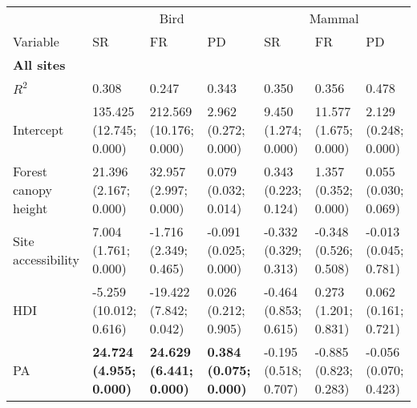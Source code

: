 \documentclass[border=1mm]{standalone}
\begin{document}
\begin{table}
\centering
\begin{tabular}[t]{l|l|l|l|l|l|l}
\hline
\multicolumn{1}{c|}{ } & \multicolumn{3}{c|}{Bird} & \multicolumn{3}{c}{Mammal} \\
\cline{2-4} \cline{5-7}
Variable & SR & FR & PD & SR & FR & PD\\
\hline
\multicolumn{7}{l}{\textbf{All sites}}\\
\hline
\hspace{1em}$R^{2}$ & 0.308 & 0.247 & 0.343 & 0.350 & 0.356 & 0.478\\
\hline
\hspace{1em}Intercept & 135.425 (12.745; 0.000) & 212.569 (10.176; 0.000) & 2.962 (0.272; 0.000) & 9.450 (1.274; 0.000) & 11.577 (1.675; 0.000) & 2.129 (0.248; 0.000)\\
\hline
\hspace{1em}Forest canopy height & 21.396 (2.167; 0.000) & 32.957 (2.997; 0.000) & 0.079 (0.032; 0.014) & 0.343 (0.223; 0.124) & 1.357 (0.352; 0.000) & 0.055 (0.030; 0.069)\\
\hline
\hspace{1em}Site accessibility & 7.004 (1.761; 0.000) & -1.716 (2.349; 0.465) & -0.091 (0.025; 0.000) & -0.332 (0.329; 0.313) & -0.348 (0.526; 0.508) & -0.013 (0.045; 0.781)\\
\hline
\hspace{1em}HDI & -5.259 (10.012; 0.616) & -19.422 (7.842; 0.042) & 0.026 (0.212; 0.905) & -0.464 (0.853; 0.615) & 0.273 (1.201; 0.831) & 0.062 (0.161; 0.721)\\
\hline
\hspace{1em}PA & \textbf{24.724 (4.955; 0.000)} & \textbf{24.629 (6.441; 0.000)} & \textbf{0.384 (0.075; 0.000)} & -0.195 (0.518; 0.707) & -0.885 (0.823; 0.283) & -0.056 (0.070; 0.423)\\
\hline
\end{tabular}
\end{table}
\end{document}
